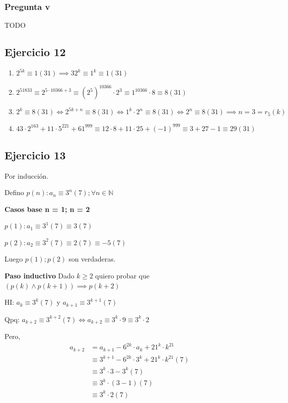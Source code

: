 \subsubsection{Pregunta v}
TODO

\subsection{Ejercicio 12}
\begin{enumerate}
    \item $ 2^{5k} \equiv 1(31) \implies 32^k \equiv 1^k \equiv 1(31)$
    \item $ 2^{51833} \equiv 2^{5\cdot 10366 + 3} \equiv (2^5)^{10366} \cdot 2^3 \equiv 1^{10366} \cdot 8 \equiv 8 (31) $
    \item $ 2^k \equiv 8(31) \iff 2^{5k+n} \equiv 8(31) \iff 1^k \cdot 2^n \equiv 8(31) \iff 2^n \equiv 8 (31) \implies n = 3 = r_5(k) $
    \item $ 43 \cdot 2^{163} + 11 \cdot 5^{221} + 61^{999} \equiv 12 \cdot 8 + 11\cdot 25 + (-1)^{999} \equiv 3 + 27 -1 \equiv 29(31)$
\end{enumerate}

\subsection{Ejercicio 13}
Por inducción.

Defino $ p(n): a_n \equiv 3^n(7); \forall n \in \mathbb{N} $

\textbf{Casos base n = 1; n = 2}

$ p(1): a_1 \equiv 3^1(7) \equiv 3(7) $

$ p(2): a_2 \equiv 3^2(7) \equiv 2(7) \equiv -5(7)$

Luego $ p(1); p(2) $ son verdaderas.

\textbf{Paso inductivo}
Dado $ k\geq 2 $ quiero probar que $ (p(k) \wedge p(k+1)) \implies p(k+2) $

HI: $a_k \equiv 3^k(7)$ y $a_{k+1} \equiv 3^{k+1}(7)$

Qpq: $a_{k+2} \equiv 3^{k+2}(7) \iff a_{k+2} \equiv 3^k \cdot 9 \equiv 3^k \cdot 2 $

Pero,
\begin{align*}
    a_{k+2} &= a_{k+1} - 6^{2k} \cdot a_k + 21^k \cdot k^{21} \\ 
    &\equiv 3^{k+1} - 6^{2k} \cdot 3^k + 21^k \cdot k^{21} (7)\\ 
    &\equiv 3^k \cdot 3 - 3^k (7)\\ 
    &\equiv 3^k \cdot (3 - 1) (7)\\ 
    &\equiv 3^k \cdot 2 (7)\\ 
\end{align*}

